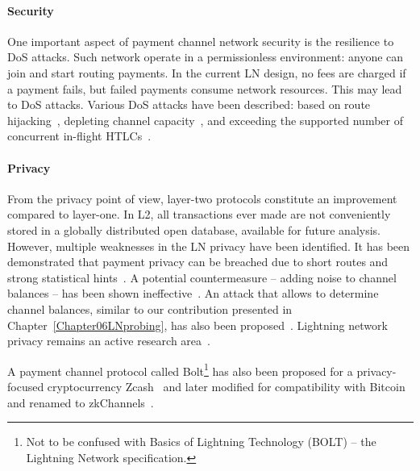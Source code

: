 \paragraph{Security}
One important aspect of payment channel network security is the resilience to DoS attacks.
Such network operate in a permissionless environment: anyone can join and start routing payments.
In the current LN design, no fees are charged if a payment fails, but failed payments consume network resources.
This may lead to DoS attacks.
Various DoS attacks have been described: based on route hijacking~\cite{Tochner2019}, depleting channel capacity~\cite{PerezSola2019}, and exceeding the supported number of concurrent in-flight HTLCs~\cite{Mizrahi2020}.

\paragraph{Privacy}
From the privacy point of view, layer-two protocols constitute an improvement compared to layer-one.
In L2, all transactions ever made are not conveniently stored in a globally distributed open database, available for future analysis.
However, multiple weaknesses in the LN privacy have been identified.
It has been demonstrated that payment privacy can be breached due to short routes and strong statistical hints~\cite{Beres2019}.
A potential countermeasure -- adding noise to channel balances -- has been shown ineffective~\cite{Tang2019}.
An attack that allows to determine channel balances, similar to our contribution presented in Chapter~\ref{Chapter06LNprobing}, has also been proposed~\cite{HerreraJoancomarti2019}.
Lightning network privacy remains an active research area~\cite{Malavolta2017, Kohen2019, Tang2020, Rohrer2020, Kappos2020}.

A payment channel protocol called Bolt\footnote{Not to be confused with Basics of Lightning Technology (BOLT) -- the Lightning Network specification.} has also been proposed for a privacy-focused cryptocurrency Zcash~\cite{Green2017} and later modified for compatibility with Bitcoin and renamed to zkChannels~\cite{Akinyele2020}.

